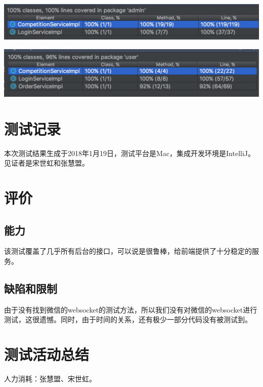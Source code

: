 \documentclass{article}
\begin{document}
			\includegraphics[scale = .3]{fig/test_8.jpg}
		
			\includegraphics[scale = .3]{fig/test_9.jpg}
		\section{测试记录}
			本次测试结果生成于2018年1月19日，测试平台是Mac，集成开发环境是IntelliJ。见证者是宋世虹和张慧盟。
		\section{评价}
			\subsection{能力}
				该测试覆盖了几乎所有后台的接口，可以说是很鲁棒，给前端提供了十分稳定的服务。
			\subsection{缺陷和限制}
				由于没有找到微信的websocket的测试方法，所以我们没有对微信的websocket进行测试，这很遗憾。同时，由于时间的关系，还有极少一部分代码没有被测试到。
		\section{测试活动总结}
			人力消耗：张慧盟、宋世虹。
\end{document}
